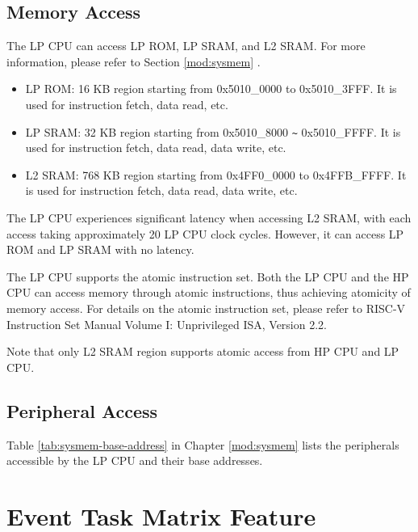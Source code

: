 \documentclass[main\_\_EN.tex]{subfiles}
\begin{document}
\subsection{Memory Access}

The \chipname{} LP CPU can access LP ROM, LP SRAM, and L2 SRAM. For more information, please refer to Section \ref{mod:sysmem} \textit{}.

\begin{itemize}
    \item LP ROM: 16 KB region starting from 0x5010\_0000 to 0x5010\_3FFF. It is used for instruction fetch, data read, etc.
    \item LP SRAM: 32 KB region starting from 0x5010\_8000 \verb+~+ 0x5010\_FFFF. It is used for instruction fetch, data read, data write, etc.
    \item L2 SRAM: 768 KB region starting from 0x4FF0\_0000 to 0x4FFB\_FFFF. It is used for instruction fetch, data read, data write, etc.

\end{itemize}


\begin{tiplisting}
The LP CPU experiences significant latency when accessing L2 SRAM, with each access taking approximately 20 LP CPU clock cycles. However, it can access LP ROM and LP SRAM with no latency.
\end{tiplisting}

The LP CPU supports the atomic instruction set. Both the LP CPU and the HP CPU can access memory through atomic instructions, thus achieving atomicity of memory access. For details on the atomic instruction set, please refer to RISC-V Instruction Set Manual Volume I: Unprivileged ISA, Version 2.2.

Note that only L2 SRAM region supports atomic access from HP CPU and LP CPU.

\subsection{Peripheral Access}

Table \ref{tab:sysmem-base-address} in Chapter \ref{mod:sysmem} \textit{} lists the peripherals accessible by the LP CPU and their base addresses.

\section{Event Task Matrix Feature}
\label{sec:ulp-etm-func}
\end{document}
